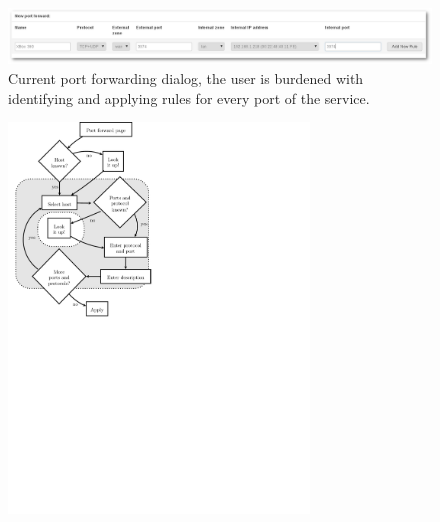 \documentclass[a4paper,11pt,makeidx]{kth-bcs}
\begin{document}
\begin{figure}[h]
   \centering
   \includegraphics[width=17cm]{ss-before-shadow}
   \caption{Current port forwarding dialog, the user is burdened with identifying and applying rules for every port of the service.}
   \label{fig:before}
\end{figure}

\begin{figure}[h] %
   \begin{minipage}[b]{0.45\linewidth}
      \centering
      \includegraphics[trim = 4mm 140mm 90mm 0mm, clip, width=8cm,natwidth=2.570in,natheight=0.580in]{before}
   \end{minipage}
   \begin{minipage}[b]{0.45\linewidth}
      \centering

\end{minipage}
\end{figure}
\end{document}
